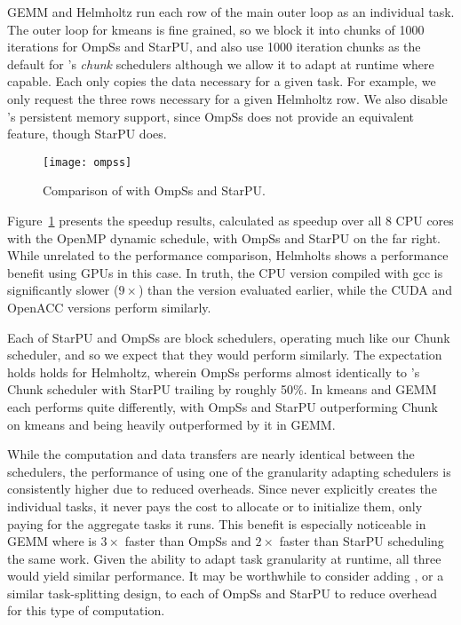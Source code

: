 GEMM and Helmholtz run each row of the main outer loop as an individual task.
The outer loop for kmeans is fine grained, so we block it into chunks of 1000
iterations for OmpSs and StarPU, and also use 1000 iteration chunks as the
default for \tsar's \emph{chunk} schedulers although we allow it to adapt at
runtime where capable. Each only copies the data necessary for a given task.
For example, we only request the three rows necessary for a given Helmholtz row.
We also disable \tsar's persistent memory support, since OmpSs does not provide an
equivalent feature, though StarPU does.

\begin{figure}[t]
    \begin{center}
        \texttt{[image: ompss]}
    \end{center}
    \caption{Comparison of \tsar with OmpSs and StarPU.\label{fig:ompssres}}
\end{figure}

Figure~\ref{fig:ompssres} presents the speedup results, calculated as speedup
over all 8 CPU cores with the OpenMP dynamic schedule, with OmpSs and StarPU
on the far right. While unrelated to the performance comparison, Helmholts
shows a performance benefit using GPUs in this case. In truth, the CPU version
compiled with gcc is significantly slower ($9\times$) than the version
evaluated earlier, while the CUDA and OpenACC versions perform similarly. 

Each of StarPU and OmpSs are block schedulers, operating much like our Chunk
scheduler, and so we expect that they would perform similarly. The expectation
holds holds for Helmholtz, wherein OmpSs performs almost identically to \tsar's
Chunk scheduler with StarPU trailing by roughly 50\%.  In kmeans and GEMM
each performs quite differently, with  OmpSs and StarPU outperforming Chunk on
kmeans and being heavily outperformed by it in GEMM.

While the computation and data transfers are nearly identical between the
schedulers, the performance of \tsar using one of the granularity adapting
schedulers is consistently higher due to reduced overheads.  Since \tsar never
explicitly creates the individual tasks, it never pays the cost to allocate or
to initialize them, only paying for the aggregate tasks it runs.  This benefit
is especially noticeable in GEMM where \tsar is $3\times$ faster than OmpSs
and $2\times$ faster than StarPU scheduling the same work.  Given the ability
to adapt task granularity at runtime, all three would yield similar
performance. It may be worthwhile to consider adding \tsar, or a similar
task-splitting design, to each of OmpSs and StarPU to reduce overhead for this
type of computation.

